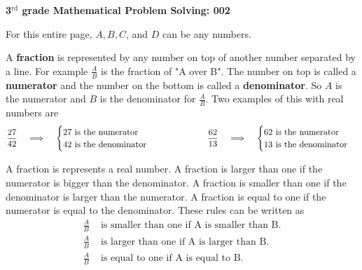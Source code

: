 \documentclass[12pt]{article}
\theoremstyle{definition}
\begin{document}
	\begin{center}
	{\LARGE \textbf{3$^{\textrm{rd}}$ grade Mathematical Problem Solving: 002}}\\
		\vspace{.6cm}
	\end{center}

\begin{center}
	For this entire page, $A,B,C$, and $D$ can be any numbers.
\end{center}
A \textbf{fraction} is represented by any number on top of another number separated by a line. For example $\frac{A}{B}$ is the fraction of "A over B". The number on top is called a \textbf{numerator} and the number on the bottom is called a \textbf{denominator}. So $A$ is the numerator and $B$ is the denominator for $\frac{A}{B}$. Two examples of this with real numbers are
\begin{align}
\frac{27}{42} \hspace{0.3cm}\implies \hspace{0.3cm}\begin{cases}
27 \textrm{ is the numerator} \\
42 \textrm{ is the denominator}
\end{cases} \hspace{2cm} \frac{62}{13} \hspace{0.3cm}\implies \hspace{0.3cm}\begin{cases}
62 \textrm{ is the numerator} \\
13 \textrm{ is the denominator}
\end{cases}
\end{align}

A fraction is represents a real number. A fraction is larger than one if the numerator is bigger than the denominator. A fraction is smaller than one if the denominator is larger than the numerator. A fraction is equal to one if the numerator is equal to the denominator. These rules can be written as
\begin{align}
\frac{A}{B} &\textrm{ is smaller than one if A is smaller than B.} \\
\frac{A}{B} &\textrm{ is larger than one if A is larger than B.} \\
\frac{A}{B} &\textrm{ is equal to one if A is equal to B.} 
\end{align} 
\end{document}
